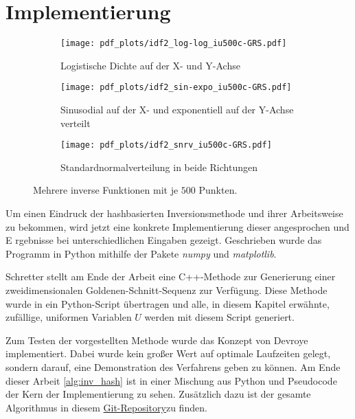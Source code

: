\section{Implementierung}
\label{impl}
\begin{figure*}%
    \centering
    \begin{subfigure}[b]{.3\textwidth}
        \centering
        \texttt{[image: pdf\_plots/idf2\_log-log\_iu500c-GRS.pdf]}
        \caption{Logistische Dichte auf der X- und Y-Achse}
        \label{fig:loglog_examplePlot}
    \end{subfigure}
    \hfill
    \begin{subfigure}[b]{.3\textwidth}
        \centering
        \texttt{[image: pdf\_plots/idf2\_sin-expo\_iu500c-GRS.pdf]}
        \caption{Sinusodial auf der X- und exponentiell auf der Y-Achse verteilt}
        \label{fig:sinexpo_examplePlot}
    \end{subfigure}
    \hfill
    \begin{subfigure}[b]{.3\textwidth}
        \centering
        \texttt{[image: pdf\_plots/idf2\_snrv\_iu500c-GRS.pdf]}
        \caption{Standardnormalverteilung in beide Richtungen}
        \label{fig:snrv_examplePlot}
    \end{subfigure}
    \caption{Mehrere inverse Funktionen mit je $500$ Punkten.}
    \label{fig:examplePlot}
\end{figure*}

Um einen Eindruck der hashbasierten Inversionsmethode und ihrer Arbeitsweise zu 
bekommen, wird jetzt eine konkrete Implementierung dieser angesprochen und E
rgebnisse bei unterschiedlichen Eingaben gezeigt. Geschrieben wurde das Programm 
in Python mithilfe der Pakete \textit{numpy} und \textit{matplotlib}.

Schretter \cite{schretter-golden_ratio_sequences-2012} stellt am Ende der Arbeit 
eine C++-Methode zur Generierung einer zweidimensionalen Goldenen-Schnitt-Sequenz 
zur Verfügung. Diese Methode wurde in ein Python-Script übertragen und alle, in 
diesem Kapitel erwähnte, zufällige, uniformen Variablen $U$ werden mit diesem Script 
generiert.

Zum Testen der vorgestellten Methode wurde das Konzept von Devroye \cite{devroye-non_uniform_random_variate-1986} 
implementiert. Dabei wurde kein großer Wert auf optimale Laufzeiten gelegt, sondern 
darauf, eine Demonstration des Verfahrens geben zu können. Am Ende dieser Arbeit \ref{alg:inv_hash}
ist in einer Mischung aus Python und Pseudocode der Kern der Implementierung zu 
sehen. Zusätzlich dazu ist der gesamte Algorithmus in diesem \href{https:github.com/knirschl/Proseminar-Anthropomatik}
{Git-Repository}zu finden. 

